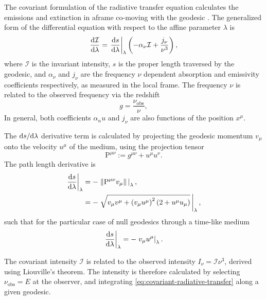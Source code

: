 The covariant formulation of the radiative transfer equation calculates the emissions and extinction in aframe co-moving with the geodesic \citep{fuerst_radiation_2004,younsi_general_2012}. The generalized form of the differential equation with respect to the affine parameter $\lambda$ is
\begin{equation}
    \label{eq:covariant-radiative-transfer}
    \frac{\text{d} \mathcal{I}}{\text{d} \lambda} = \left. \frac{\text{d} s}{\text{d} \lambda} \right\rvert_\lambda \left( -\alpha_\nu \mathcal{I} + \frac{j_\nu}{\nu^3} \right),
\end{equation}
where $\mathcal{I}$ is the invariant intensity, $s$ is the proper length traversed by the geodesic, and $\alpha_\nu$ and $j_\nu$ are the frequency $\nu$ dependent absorption and emissivity coefficients respectively, as measured in the local frame. The frequency $\nu$ is related to the observed frequency via the redshift
\begin{equation}
    g = \frac{\nu_\text{obs}}{\nu},
\end{equation}
In general, both coefficients $\alpha_nu$ and $j_\nu$ are also functions of the position $x^\mu$. 

The $\text{d} s / \text{d} \lambda$ derivative term is calculated by projecting the geodesic momentum $v_\mu$ onto the velocity $u^\mu$ of the medium, using the projection tensor
\begin{equation}
    \mathrm{P}^{\mu\nu} := g^{\mu\nu} + u^\mu u^\nu.
\end{equation}
The path length derivative is 
\begin{align}
    \left. \frac{\text{d} s}{\text{d} \lambda} \right\rvert_\lambda
    &= - \left. \left\lVert \mathrm{P}^{\mu\nu} v_\mu\right\rVert\, \right\rvert_\lambda,\\
    &= - \left. \sqrt{v_\mu v^\mu + \left(v_\mu u^\mu\right)^2 \left(2 + u^\mu u_\mu\right)} \, \right\rvert_\lambda,
\end{align}
such that for the particular case of null geodesics through a time-like medium
\begin{equation}
    \left. \frac{\text{d} s}{\text{d} \lambda} \right\rvert_\lambda = - \left. v_\mu u^\mu \right\rvert_\lambda.
\end{equation}

The covariant intensity $\mathcal{I}$ is related to the observed intensity $I_\nu = \mathcal{I} \nu^3$, derived using Liouville's theorem. The intensity is therefore calculated by selecting $\nu_\text{obs} = E$ at the observer, and integrating \eqref{eq:covariant-radiative-transfer} along a given geodesic. 


